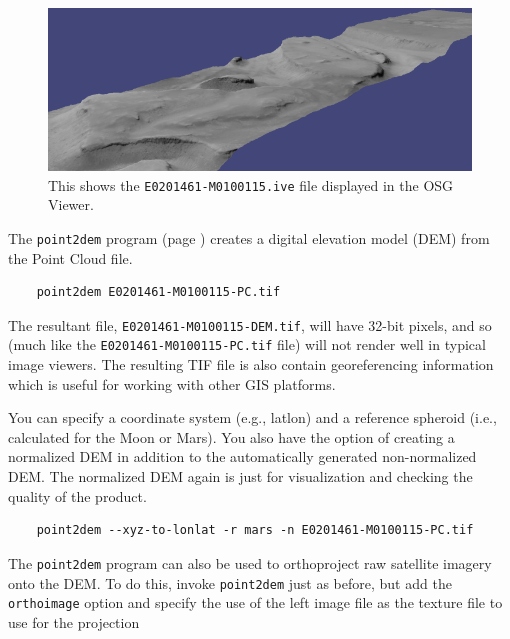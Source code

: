 \begin{figure}[h]
\begin{minipage}{5in}
\includegraphics[width=5in]{images/p19-osg.png}
\end{minipage}
\hfill
\begin{minipage}{1.7in}
\caption[P19 in OSG]{
    \label{p19-osg}
	This shows the \texttt{E0201461-M0100115.ive} file displayed in
	the OSG Viewer.
    }
\end{minipage}
\end{figure}

The \texttt{point2dem} program (page \pageref{point2dem}) creates
a digital elevation model (DEM) from the Point Cloud file.

\begin{verbatim}
    point2dem E0201461-M0100115-PC.tif
\end{verbatim}

The resultant file, \texttt{E0201461-M0100115-DEM.tif}, will have
32-bit pixels, and so (much like the \texttt{E0201461-M0100115-PC.tif}
file) will not render well in typical image viewers. The resulting TIF
file is also contain georeferencing information which is useful for
working with other GIS platforms.

You can specify a coordinate system (e.g., latlon) and a reference
spheroid (i.e., calculated for the Moon or Mars). You also have the
option of creating a normalized DEM in addition to the automatically
generated non-normalized DEM. The normalized DEM again is just for
visualization and checking the quality of the product.

\begin{verbatim}
    point2dem --xyz-to-lonlat -r mars -n E0201461-M0100115-PC.tif
\end{verbatim}

\noindent
The \texttt{point2dem} program can also be used to orthoproject raw
satellite imagery onto the DEM. To do this, invoke \texttt{point2dem}
just as before, but add the \texttt{orthoimage} option and specify
the use of the left image file as the texture file to use for the
projection

